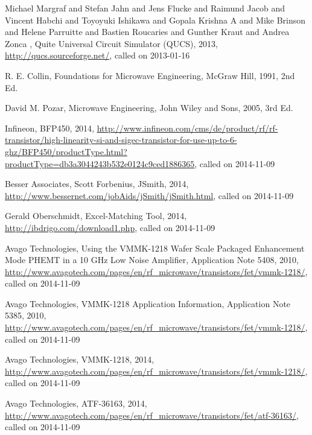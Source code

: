 \begin{thebibliography}{1}
	 { Michael Margraf and Stefan Jahn and Jens Flucke and Raimund Jacob and Vincent Habchi and Toyoyuki Ishikawa and Gopala Krishna A  and Mike Brinson  and Helene Parruitte and Bastien Roucaries and  Gunther Kraut and Andrea Zonca },	 {Quite Universal Circuit Simulator (QUCS)},
   {2013},
   \url{http://qucs.sourceforge.net/},
   {called on 2013-01-16}

 {R. E. Collin},
 {Foundations for Microwave Engineering},
 {McGraw Hill},
 1991,
 2nd Ed.


  {David M. Pozar},
   {Microwave Engineering},
  {John Wiley and Sons},
  2005,
  3rd Ed.

  {Infineon},
  {BFP450},
  {2014},
  \url{http://www.infineon.com/cms/de/product/rf/rf-transistor/high-linearity-si-and-sigec-transistor-for-use-up-to-6-ghz/BFP450/productType.html?productType=db3a3044243b532e0124c9ced1886365},
  {called on 2014-11-09}


  {Besser Associates}, 
  {Scott Forbenius},
  {JSmith},
  {2014},
  \url{http://www.bessernet.com/jobAids/jSmith/jSmith.html},
  {called on 2014-11-09}


  {Gerald Oberschmidt},
  {Excel-Matching Tool},
  {2014},
  \url{http://ibdrigo.com/download1.php},
  {called on 2014-11-09}


  {Avago Technologies},
  {Using the VMMK-1218 Wafer Scale Packaged Enhancement Mode PHEMT 
in a 10 GHz Low Noise Amplifier, Application Note 5408},
  {2010},
  \url{http://www.avagotech.com/pages/en/rf_microwave/transistors/fet/vmmk-1218/},
  {called on 2014-11-09}


  {Avago Technologies},
  {VMMK-1218 Application Information, Application Note 5385},
  {2010},
  \url{http://www.avagotech.com/pages/en/rf_microwave/transistors/fet/vmmk-1218/},
  {called on 2014-11-09}


  {Avago Technologies},
  {VMMK-1218},
  {2014},
  \url{http://www.avagotech.com/pages/en/rf_microwave/transistors/fet/vmmk-1218/},
  {called on 2014-11-09}


  {Avago Technologies},
  {ATF-36163},
  {2014},
  \url{http://www.avagotech.com/pages/en/rf_microwave/transistors/fet/atf-36163/},
  {called on 2014-11-09}


\end{thebibliography}
